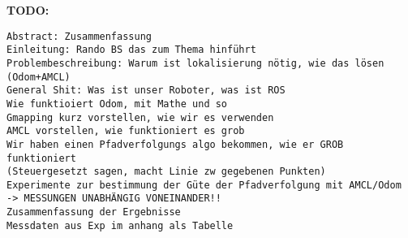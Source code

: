 \documentclass[11pt,a4paper]{article}
\begin{document}
\textbf{TODO:}
\begin{verbatim}
Abstract: Zusammenfassung
Einleitung: Rando BS das zum Thema hinführt
Problembeschreibung: Warum ist lokalisierung nötig, wie das lösen (Odom+AMCL)
General Shit: Was ist unser Roboter, was ist ROS
Wie funktioiert Odom, mit Mathe und so
Gmapping kurz vorstellen, wie wir es verwenden
AMCL vorstellen, wie funktioniert es grob
Wir haben einen Pfadverfolgungs algo bekommen, wie er GROB funktioniert 
(Steuergesetzt sagen, macht Linie zw gegebenen Punkten)
Experimente zur bestimmung der Güte der Pfadverfolgung mit AMCL/Odom 
-> MESSUNGEN UNABHÄNGIG VONEINANDER!!
Zusammenfassung der Ergebnisse
Messdaten aus Exp im anhang als Tabelle

\end{verbatim} 
\end{document}
